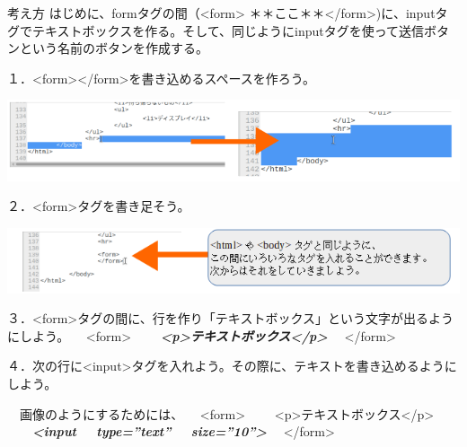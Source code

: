 \documentclass[a4paper,12pt,dvipdfmx]{jarticle}
\begin{document}
考え方\newline
はじめに、formタグの間（{\textless}form{\textgreater}
＊＊ここ＊＊{\textless}/form{\textgreater})に、inputタグでテキストボックスを作る。そして、同じようにinputタグを使って送信ボタンという名前のボタンを作成する。

１．{\textless}form{\textgreater}{\textless}/form{\textgreater}を書き込めるスペースを作ろう。



\centering
\includegraphics[width=\textwidth]{ome7-img035.png}
\flushleft

２．{\textless}form{\textgreater}タグを書き足そう。



\centering
\includegraphics[width=\textwidth]{ome7-img036.png}
\flushleft


\bigskip


\bigskip

３．{\textless}form{\textgreater}タグの間に、行を作り「テキストボックス」という文字が出るようにしよう。\newline
\ \ {\textless}form{\textgreater}\newline
\ \ \ \ \textbf{\textit{{\textless}p{\textgreater}テキストボックス{\textless}/p{\textgreater}}}\newline
\ \ {\textless}/form{\textgreater}

\bigskip

\clearpage

４．次の行に{\textless}input{\textgreater}タグを入れよう。その際に、テキストを書き込めるようにしよう。

\ \ 画像のようにするためには、\newline
\ \ {\textless}form{\textgreater}\newline
\ \ \ \ {\textless}p{\textgreater}テキストボックス{\textless}/p{\textgreater}\newline
\ \ \ \ \textbf{\textit{{\textless}input \ \ type=”text” \ \ size=”10”{\textgreater}}}\newline
\ \ {\textless}/form{\textgreater}
\end{document}
